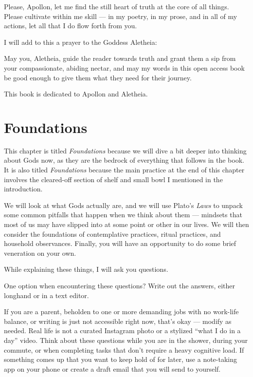 \documentclass[
]{book}
\begin{document}
Please, Apollon, let me find the still heart of truth at the core of all things. Please cultivate within me skill --- in my poetry, in my prose, and in all of my actions, let all that I do flow forth from you.

I will add to this a prayer to the Goddess Aletheia:

May you, Aletheia, guide the reader towards truth and grant them a sip from your compassionate, abiding nectar, and may my words in this open access book be good enough to give them what they need for their journey.

This book is dedicated to Apollon and Aletheia.

\hypertarget{foundations}{%
\chapter{Foundations}\label{foundations}}

This chapter is titled \emph{Foundations} because we will dive a bit deeper into thinking about Gods now, as they are the bedrock of everything that follows in the book. It is also titled \emph{Foundations} because the main practice at the end of this chapter involves the cleared-off section of shelf and small bowl I mentioned in the introduction.

We will look at what Gods actually are, and we will use Plato's \emph{Laws} to unpack some common pitfalls that happen when we think about them --- mindsets that most of us may have slipped into at some point or other in our lives. We will then consider the foundations of contemplative practices, ritual practices, and household observances. Finally, you will have an opportunity to do some brief veneration on your own.

While explaining these things, I will ask you questions.

One option when encountering these questions? Write out the answers, either longhand or in a text editor.

If you are a parent, beholden to one or more demanding jobs with no work-life balance, or writing is just not accessible right now, that's okay --- modify as needed. Real life is not a curated Instagram photo or a stylized ``what I do in a day'' video. Think about these questions while you are in the shower, during your commute, or when completing tasks that don't require a heavy cognitive load. If something comes up that you want to keep hold of for later, use a note-taking app on your phone or create a draft email that you will send to yourself.
\end{document}
